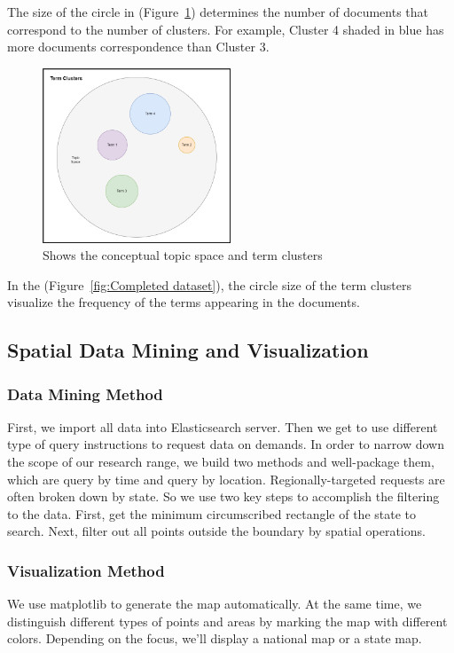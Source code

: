 The size of the circle in (Figure~\ref{fig:Shows the conceptual2}) determines
the number of documents that correspond to the number of clusters. For
example, Cluster 4 shaded in blue has more documents correspondence than
Cluster 3.
\begin{figure}[H]
\centering
\includegraphics[width=0.5\textwidth]{imgs/term_clusters.png}
\caption{\label{fig:Shows the conceptual2} Shows the conceptual topic space and term clusters}
\end{figure}
In the (Figure~\ref{fig:Completed dataset}), the circle size of the term
clusters visualize the frequency of the terms appearing in the documents.

\subsection{Spatial Data Mining and Visualization}
\subsubsection{Data Mining Method}
First, we import all data into Elasticsearch server. Then we get to use
different type of query instructions to request data on demands. In order to
narrow down the scope of our research range, we build two methods and
well-package them, which are query by time and query by location.
Regionally-targeted requests are often broken down by state. So we use two
key steps to accomplish the filtering to the data. First, get the minimum
circumscribed rectangle of the state to search. Next, filter out all points
outside  the boundary by spatial operations. 

\subsubsection{Visualization Method}
We use matplotlib to generate the map automatically. At the same time, we
distinguish different types of points and areas by marking the map with
different colors. Depending on the focus, we'll display a national map or a
state map.
